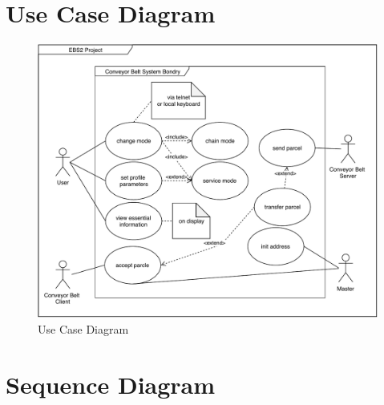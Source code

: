 \documentclass[a4paper,12pt,twoside]{scrreprt}
\begin{document}
\section{Use Case Diagram}
\label{chap:Use_Case_Diagram}

\begin{figure}[H]
	\centering
	\includegraphics[width=\textwidth,height=\textheight,keepaspectratio]{useCaseDiagram/UseCaseDiagram.pdf}
	\caption[Use Case Diagram]{Use Case Diagram}
	\label{fig:UseCaseDiagram}
\end{figure}

\section{Sequence Diagram}
\label{chap:Sequence_Diagram}
\end{document}
